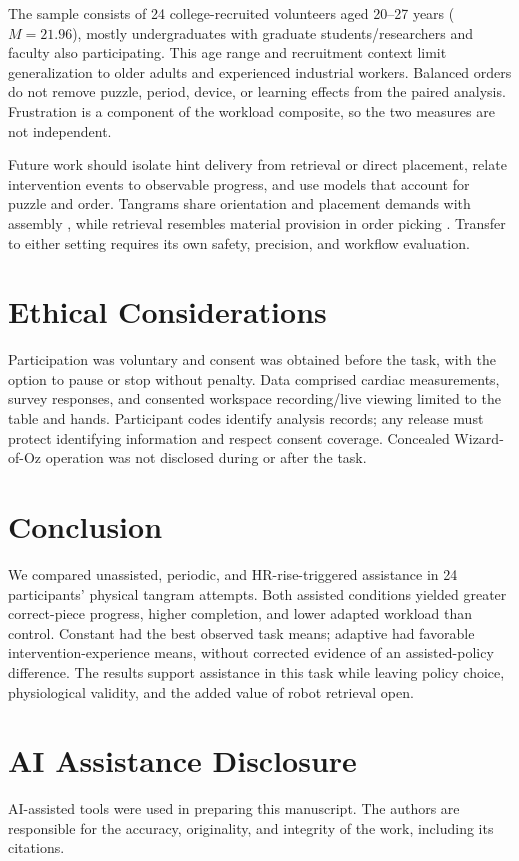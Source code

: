\documentclass[sigconf,anonymous]{aamas}
\begin{document}
The sample consists of 24 college-recruited volunteers aged 20--27 years ($M=21.96$), mostly undergraduates with graduate students/researchers and faculty also participating. This age range and recruitment context limit generalization to older adults and experienced industrial workers. Balanced orders do not remove puzzle, period, device, or learning effects from the paired analysis. Frustration is a component of the workload composite, so the two measures are not independent.

Future work should isolate hint delivery from retrieval or direct placement, relate intervention events to observable progress, and use models that account for puzzle and order. Tangrams share orientation and placement demands with assembly \cite{zhao2025}, while retrieval resembles material provision in order picking \cite{smit2024}. Transfer to either setting requires its own safety, precision, and workflow evaluation.

\section{Ethical Considerations}

Participation was voluntary and consent was obtained before the task, with the option to pause or stop without penalty. Data comprised cardiac measurements, survey responses, and consented workspace recording/live viewing limited to the table and hands. Participant codes identify analysis records; any release must protect identifying information and respect consent coverage. Concealed Wizard-of-Oz operation was not disclosed during or after the task.

\section{Conclusion}

We compared unassisted, periodic, and HR-rise-triggered assistance in 24 participants' physical tangram attempts. Both assisted conditions yielded greater correct-piece progress, higher completion, and lower adapted workload than control. Constant had the best observed task means; adaptive had favorable intervention-experience means, without corrected evidence of an assisted-policy difference. The results support assistance in this task while leaving policy choice, physiological validity, and the added value of robot retrieval open.

\section*{AI Assistance Disclosure}

AI-assisted tools were used in preparing this manuscript. The authors are responsible for the accuracy, originality, and integrity of the work, including its citations.



\end{document}
